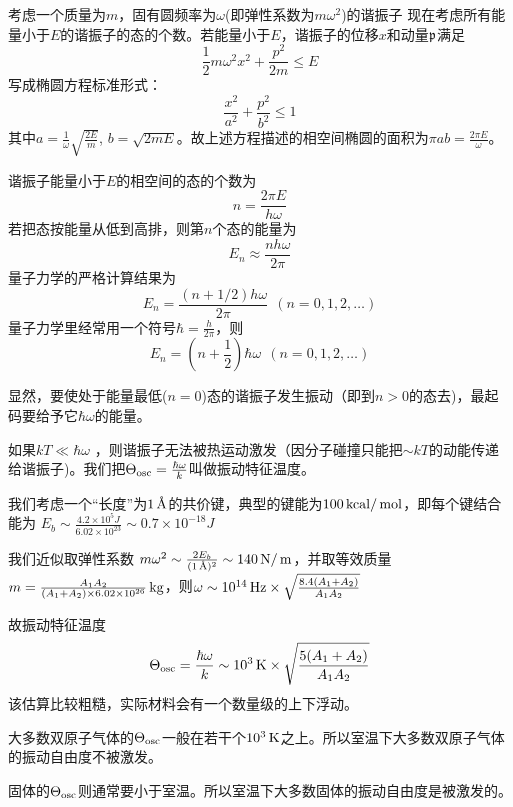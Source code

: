 \documentclass[CJK]{beamer}
\begin{document}
\begin{frame}
\bch
{\small 
考虑一个质量为$m$，固有圆频率为$\omega$(即弹性系数为$m\omega^2$)的谐振子
现在考虑所有能量小于$E$的谐振子的态的个数。若能量小于$E$，谐振子的位移$x$和动量${\mathfrak{p}}$满足
$$\frac{1}{2}m \omega^2 x^2 + \frac{p^2}{2m} \le E $$
写成椭圆方程标准形式：
$$\frac{x^2} {a^2} + \frac{p^2}{b^2} \le 1 $$
其中$a = \frac{1}{\omega}\sqrt{\frac{2E}{m}}$, $b = \sqrt{2mE}$。故上述方程描述的相空间椭圆的面积为$ \pi a b = \frac{2\pi E}{\omega}$。
}
\ech
\end{frame}


\begin{frame}
\bch
{\small 
谐振子能量小于$E$的相空间的态的个数为
$$n = \frac{2\pi E}{ h \omega}$$
若把态按能量从低到高排，则第$n$个态的能量为
$$ E_n \approx \frac{ n h\omega}{2\pi}$$
量子力学的严格计算结果为
$$ E_n = \frac{ (n+1/2) h\omega}{2\pi}\ \ (n = 0,1,2,\ldots)$$
量子力学里经常用一个符号{\blue $\hbar = \frac{h}{2\pi}$}，则
$$ E_n = \left(n + \frac{1}{2}\right) \hbar\omega\ \ (n = 0,1,2,\ldots)$$

}
\ech
\end{frame}


\begin{frame}
\bch
{\small 
显然，要使处于能量最低($n=0$)态的谐振子发生振动（即到$n>0$的态去)，最起码要给予它$\hbar \omega$的能量。

\skipline

如果$kT\ll \hbar\omega$ ，则谐振子无法被热运动激发（因分子碰撞只能把$\sim kT$的动能传递给谐振子)。我们把$\Theta_{\rm osc} = \frac{\hbar\omega}{k}$叫做振动特征温度。
}
\ech
\end{frame}


\begin{frame}
\bch
{\small
我们考虑一个“长度”为$1\,\text{\AA}$的共价键，典型的键能为$100\,\mathrm{kcal}/\,\mathrm{mol}$，即每个键结合能为
$E_b\sim \frac{4.2\times 10^5J}{6.02\times 10^{23}} \sim 0.7\times 10^{-18}J$

我们近似取弹性系数
$m\omega^2 \sim  \frac{2E_b}{(1 \,\text{\AA})^2} \sim 140 \,\mathrm{N}/\,\mathrm{m}$，并取等效质量$m = \frac{A_1A_2}{(A_1+A_2)\times 6.02\times 10^{26}} \,\mathrm{kg}$，则$\omega \sim 10^{14}\,\mathrm{Hz} \times \sqrt{\frac{8.4(A_1+A_2)}{A_1A_2}} $

故振动特征温度
$$\Theta_{\rm osc} =\frac{\hbar \omega}{k} \sim 10^3\,\mathrm{K} \times \sqrt{\frac{5(A_1+A_2)}{A_1A_2}} $$
该估算比较粗糙，实际材料会有一个数量级的上下浮动。
\bitem
\item{大多数双原子气体的$\Theta_{\rm osc}$一般在若干个$10^3\,\mathrm{K}$之上。所以{\blue 室温下大多数双原子气体的振动自由度不被激发}。}
\item{固体的$\Theta_{\rm osc}$则通常要小于室温。所以{\blue 室温下大多数固体的振动自由度是被激发的}。}
\eitem
}
\ech
\end{frame}
\end{document}
